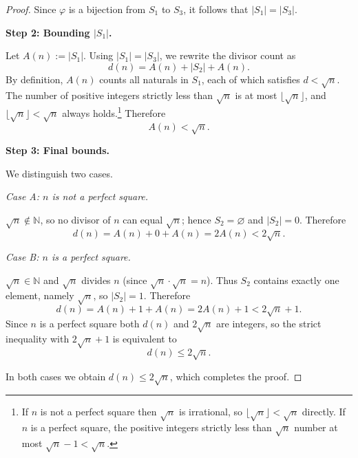 \documentclass[12pt]{article}
\theoremstyle{remark}
\begin{document}
\begin{proof}
\medskip
Since $\varphi$ is a bijection from $S_1$ to $S_3$, it follows that
$|S_1| = |S_3|$.

\pagebreak
\noindent\textbf{Step 2: Bounding $|S_1|$.}

Let $A(n) := |S_1|$.  Using $|S_1| = |S_3|$, we rewrite the divisor count as
\[
    d(n) = A(n) + |S_2| + A(n).
\]
By definition, $A(n)$ counts all naturals in $S_1$, each of which satisfies
$d < \sqrt{n}$.  The number of positive integers strictly less than $\sqrt{n}$
is at most $\lfloor\sqrt{n}\rfloor$, and $\lfloor\sqrt{n}\rfloor < \sqrt{n}$
always holds.\footnote{%
  If $n$ is not a perfect square then $\sqrt{n}$ is irrational, so
  $\lfloor\sqrt{n}\rfloor < \sqrt{n}$ directly.
  If $n$ is a perfect square, the positive integers strictly less than
  $\sqrt{n}$ number at most $\sqrt{n}-1 < \sqrt{n}$.}
Therefore
\[
    A(n) < \sqrt{n}.
\]


\noindent\textbf{Step 3: Final bounds.}

We distinguish two cases.

\medskip
\noindent\textit{Case A: $n$ is not a perfect square.}

$\sqrt{n} \notin \mathbb{N}$, so no divisor of $n$ can equal $\sqrt{n}$; hence
$S_2 = \varnothing$ and $|S_2| = 0$.  Therefore
\[
    d(n) = A(n) + 0 + A(n) = 2A(n) < 2\sqrt{n}.
\]

\medskip
\noindent\textit{Case B: $n$ is a perfect square.}

$\sqrt{n} \in \mathbb{N}$ and $\sqrt{n}$ divides $n$ (since
$\sqrt{n} \cdot \sqrt{n} = n$).  Thus $S_2$ contains exactly one element,
namely $\sqrt{n}$, so $|S_2| = 1$.  Therefore
\[
    d(n) = A(n) + 1 + A(n) = 2A(n) + 1 < 2\sqrt{n} + 1.
\]
Since $n$ is a perfect square both $d(n)$ and $2\sqrt{n}$ are integers, so
the strict inequality with $2\sqrt{n}+1$ is equivalent to
\[
    d(n) \leq 2\sqrt{n}.
\]

\medskip
\noindent In both cases we obtain $d(n) \leq 2\sqrt{n}$, which completes the
proof.
\end{proof}
\end{document}
